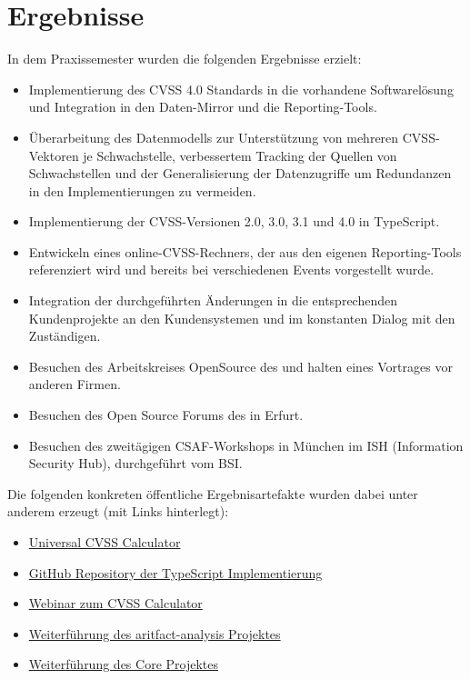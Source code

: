 
\chapter{Ergebnisse} \label{ch:ergebnisse}

In dem Praxissemester wurden die folgenden Ergebnisse erzielt:

\begin{itemize}
    \item Implementierung des CVSS 4.0 Standards in die vorhandene Softwarelösung und Integration in den Daten-Mirror und die Reporting-Tools.
    \item Überarbeitung des Datenmodells zur Unterstützung von mehreren CVSS-Vektoren je Schwachstelle, verbessertem Tracking der Quellen von Schwachstellen und der Generalisierung der Datenzugriffe um Redundanzen in den Implementierungen zu vermeiden.
    \item Implementierung der CVSS-Versionen 2.0, 3.0, 3.1 und 4.0 in TypeScript.
    \item Entwickeln eines online-CVSS-Rechners, der aus den eigenen Reporting-Tools referenziert wird und bereits bei verschiedenen Events vorgestellt wurde.
    \item Integration der durchgeführten Änderungen in die entsprechenden Kundenprojekte an den Kundensystemen und im konstanten Dialog mit den Zuständigen.
    \item Besuchen des Arbeitskreises OpenSource des {\bitkom} und halten eines Vortrages vor anderen Firmen.
    \item Besuchen des Open Source Forums des {\bitkom} in Erfurt.
    \item Besuchen des zweitägigen CSAF-Workshops in München im ISH (Information Security Hub), durchgeführt vom BSI\@.
\end{itemize}

Die folgenden konkreten öffentliche Ergebnisartefakte wurden dabei unter anderem erzeugt (mit Links hinterlegt):

\begin{itemize}[noitemsep]
    \item \href{https://www.metaeffekt.com/security/cvss/calculator}{Universal CVSS Calculator}
    \item \href{https://github.com/org-metaeffekt/metaeffekt-universal-cvss-calculator}{GitHub Repository der TypeScript Implementierung}
    \item \href{https://youtu.be/R2S0_6-NQGQ?si=d7zpxbJ7P4R26nRb&t=2801}{Webinar zum CVSS Calculator}
    \item \href{https://mvnrepository.com/artifact/com.metaeffekt.artifact.analysis/ae-artifact-analysis}{Weiterführung des aritfact-analysis Projektes}
    \item \href{https://github.com/org-metaeffekt/metaeffekt-core}{Weiterführung des Core Projektes}
\end{itemize}
